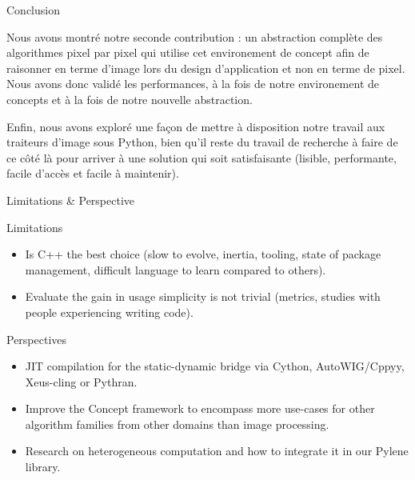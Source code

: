 \documentclass[12pt,aspectratio=169]{beamer}
\begin{document}
\begin{frame}{Conclusion}
{    Nous avons montré notre seconde contribution : un abstraction complète des algorithmes pixel par pixel qui utilise cet environement de concept afin de raisonner en terme d'image lors du design d'application et non en terme de pixel.
    Nous avons donc validé les performances, à la fois de notre environement de concepts et à la fois de notre nouvelle abstraction.

    Enfin, nous avons exploré une façon de mettre à disposition notre travail aux traiteurs d'image sous Python, bien qu'il reste du travail de recherche à faire de ce côté là pour arriver à une solution qui soit satisfaisante (lisible, performante, facile d'accès et facile à maintenir).
  }
\end{frame}

\begin{frame}{Limitations \& Perspective}
  \begin{alertblock}{Limitations}
    \footnotesize
    \begin{itemize}
      \item Is C++ the best choice (slow to evolve, inertia, tooling, state of package management, difficult language
            to learn compared to others).
      \item Evaluate the gain in usage simplicity is not trivial (metrics, studies with people experiencing writing
            code).
    \end{itemize}
  \end{alertblock}
  \begin{alertblock}{Perspectives}
    \footnotesize
    \begin{itemize}
      \item JIT compilation for the static-dynamic bridge via Cython, AutoWIG/Cppyy, Xeus-cling or Pythran.
      \item Improve the Concept framework to encompass more use-cases for other algorithm families from other domains
            than image processing.
      \item Research on heterogeneous computation and how to integrate it in our Pylene library.
    \end{itemize}
  \end{alertblock}

\end{frame}
\end{document}
